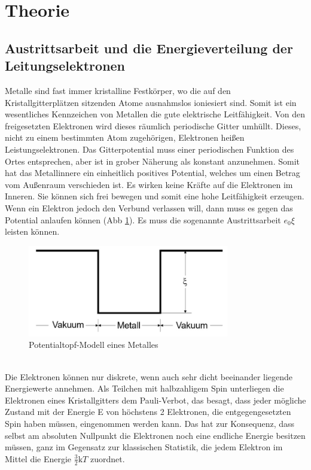 \section{Theorie}
\label{sec:Theorie}

\subsection{Austrittsarbeit und die Energieverteilung der Leitungselektronen}
Metalle sind fast immer kristalline Festkörper, wo die auf den Kristallgitterplätzen sitzenden Atome ausnahmslos ioniesiert sind.
Somit ist ein wesentliches Kennzeichen von Metallen die gute elektrische Leitfähigkeit.
Von den freigesetzten Elektronen wird dieses räumlich periodische Gitter umhüllt.
Dieses, nicht zu einem bestimmten Atom zugehörigen, Elektronen heißen Leistungselektronen.
Das Gitterpotential muss einer periodischen Funktion des Ortes entsprechen, aber ist in grober Näherung als konstant anzunehmen.
Somit hat das Metallinnere ein einheitlich positives Potential, welches um einen Betrag \Phi vom Außenraum verschieden ist.
Es wirken keine Kräfte auf die Elektronen im Inneren.
Sie können sich frei bewegen und somit eine hohe Leitfähigkeit erzeugen.
Wenn ein Elektron jedoch den Verbund verlassen will, dann muss es gegen das Potential \xi anlaufen können (Abb \ref{fig:abb1}).
Es muss die sogenannte Austrittsarbeit $e_0\xi$ leisten können.
\begin{figure}
    \centering
    \includegraphics[height=4.0cm]{data/abb1.jpg}
    \caption{Potentialtopf-Modell eines Metalles \cite{V504}}
    \label{fig:abb1}
\end{figure} \\
\noindent
Die Elektronen können nur diskrete, wenn auch sehr dicht beeinander liegende Energiewerte annehmen.
Als Teilchen mit halbzahligem Spin unterliegen die Elektronen eines Kristallgitters dem Pauli-Verbot, das besagt, dass jeder mögliche Zustand mit der Energie E von höchstens 2 Elektronen, die entgegengesetzten Spin haben müssen, eingenommen werden kann.
Das hat zur Konsequenz, dass selbst am absoluten Nullpunkt die Elektronen noch eine endliche Energie besitzen müssen, ganz im Gegensatz zur klassischen Statistik, die jedem Elektron im Mittel die Energie $\frac{3}{2}\text{k}T$ zuordnet.
